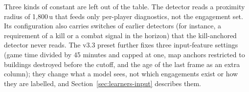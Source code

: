 Three kinds of constant are left out of the table. The detector reads a proximity radius of 1,800\,u
that feeds only per-player diagnostics, not the engagement set. Its configuration also carries switches
of earlier detectors (for instance, a requirement of a kill or a combat signal in the horizon) that the
kill-anchored detector never reads. The v3.3 preset further fixes three input-feature settings (game time
divided by 45 minutes and capped at one, map anchors restricted to buildings destroyed before the cutoff,
and the age of the last frame as an extra column); they change what a model sees, not which engagements
exist or how they are labelled, and Section~\ref{sec:learners-input} describes them.
